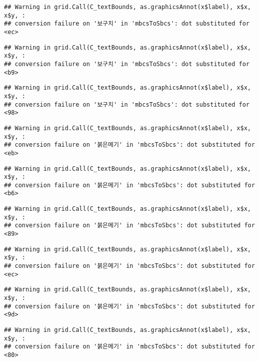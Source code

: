 \documentclass[
]{article}
\begin{document}
\begin{verbatim}
## Warning in grid.Call(C_textBounds, as.graphicsAnnot(x$label), x$x, x$y, :
## conversion failure on '보구치' in 'mbcsToSbcs': dot substituted for <ec>
\end{verbatim}

\begin{verbatim}
## Warning in grid.Call(C_textBounds, as.graphicsAnnot(x$label), x$x, x$y, :
## conversion failure on '보구치' in 'mbcsToSbcs': dot substituted for <b9>
\end{verbatim}

\begin{verbatim}
## Warning in grid.Call(C_textBounds, as.graphicsAnnot(x$label), x$x, x$y, :
## conversion failure on '보구치' in 'mbcsToSbcs': dot substituted for <98>
\end{verbatim}

\begin{verbatim}
## Warning in grid.Call(C_textBounds, as.graphicsAnnot(x$label), x$x, x$y, :
## conversion failure on '붉은메기' in 'mbcsToSbcs': dot substituted for <eb>
\end{verbatim}

\begin{verbatim}
## Warning in grid.Call(C_textBounds, as.graphicsAnnot(x$label), x$x, x$y, :
## conversion failure on '붉은메기' in 'mbcsToSbcs': dot substituted for <b6>
\end{verbatim}

\begin{verbatim}
## Warning in grid.Call(C_textBounds, as.graphicsAnnot(x$label), x$x, x$y, :
## conversion failure on '붉은메기' in 'mbcsToSbcs': dot substituted for <89>
\end{verbatim}

\begin{verbatim}
## Warning in grid.Call(C_textBounds, as.graphicsAnnot(x$label), x$x, x$y, :
## conversion failure on '붉은메기' in 'mbcsToSbcs': dot substituted for <ec>
\end{verbatim}

\begin{verbatim}
## Warning in grid.Call(C_textBounds, as.graphicsAnnot(x$label), x$x, x$y, :
## conversion failure on '붉은메기' in 'mbcsToSbcs': dot substituted for <9d>
\end{verbatim}

\begin{verbatim}
## Warning in grid.Call(C_textBounds, as.graphicsAnnot(x$label), x$x, x$y, :
## conversion failure on '붉은메기' in 'mbcsToSbcs': dot substituted for <80>
\end{verbatim}
\end{document}
